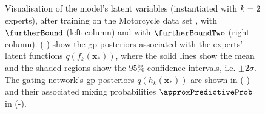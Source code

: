 \documentclass{mimosis-class/mimosis}
\numberwithin{equation}{chapter}
\newcommand{\modeInd}{\ensuremath{k}}
\newcommand{\ModeInd}{\ensuremath{\MakeUppercase{\modeInd}}}
\newcommand{\mode}[1]{\ensuremath{#1_{\modeInd}}}
\newcommand{\x}{\ensuremath{\mathbf{x}}}
\newcommand{\latentFunc}{\ensuremath{f}}
\begin{document}
{\begin{figure}[hbt!]
\begin{minipage}[r]{0.49\textwidth}
\label{fig-mixing-probs-mcycle-two-experts-further}
\end{minipage}
\caption[\acrshort{mosvgpe}'s latent variables' posteriors with $\ModeInd=2$ after training on motorcycle data set with $\furtherBound$ and $\furtherBoundTwo$]{Visualisation of the model's latent variables (instantiated with $\ModeInd=2$ experts), after training on the
Motorcycle data set \citep{Silverman1985}, with $\furtherBound$ (left column)
and with $\furtherBoundTwo$ (right column).
(-) show the \acrshort{gp}
posteriors associated with the experts' latent functions $q(\mode{\latentFunc}(\x_*))$,
where the solid lines show the mean and the shaded regions show the $95\%$ confidence intervals, i.e. $\pm2\sigma$.
The gating network's \acrshort{gp} posteriors $q(h_{k}(\x_*))$ are shown in
(-) and
their associated mixing probabilities $\approxPredictiveProb$ in
(-).}
\label{fig-latent-mcycle-two-experts}
\end{figure}
\clearpage

}
\end{document}

